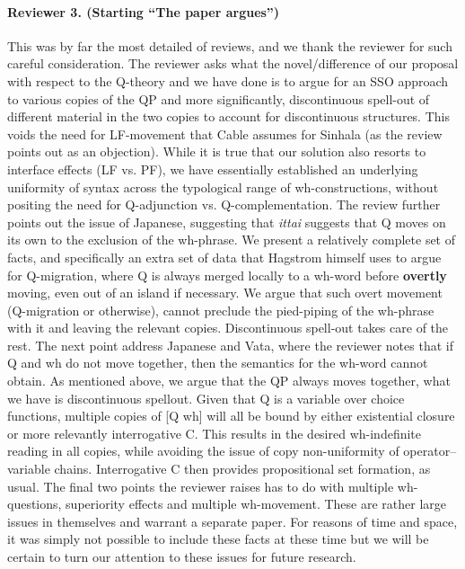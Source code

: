 \documentclass[11pt]{article}
\begin{document}
\paragraph{Reviewer 3.  (Starting ``The paper argues'')} This was by far the most detailed of reviews, and we thank the reviewer for such careful consideration. The reviewer asks what the novel/difference of our proposal with respect to the Q-theory and we have done is to argue for an SSO approach to various copies of the QP and more significantly, discontinuous spell-out of different material in the two copies to account for discontinuous structures. This voids the need for LF-movement that Cable assumes for Sinhala (as the review points out as an objection). While it is true that our solution also resorts to interface effects (LF vs. PF), we have essentially established an underlying uniformity of syntax across the typological range of wh-constructions, without positing the need for Q-adjunction vs. Q-complementation. The review further points out the issue of Japanese, suggesting that \textit{ittai} suggests that Q moves on its own to the exclusion of the wh-phrase. We present a relatively complete set of facts, and specifically an extra set of data that Hagstrom himself uses to argue for Q-migration, where Q is always merged locally to a wh-word before \textbf{overtly} moving, even out of an island if necessary. We argue that such overt movement (Q-migration or otherwise), cannot preclude the pied-piping of the wh-phrase with it and leaving the relevant copies. Discontinuous spell-out takes care of the rest. The next point address Japanese and Vata, where the reviewer notes that if Q and wh do not move together, then the semantics for the wh-word cannot obtain. As mentioned above, we argue that the QP always moves together, what we have is discontinuous spellout. Given that Q is a variable over choice functions, multiple copies of [Q wh] will all be bound by either existential closure or more relevantly interrogative C. This results in the desired wh-indefinite reading in all copies, while avoiding the issue of copy non-uniformity of operator--variable chains. Interrogative C then provides propositional set formation, as usual. The final two points the reviewer raises has to do with multiple wh-questions, superiority effects and multiple wh-movement. These are rather large issues in themselves and warrant a separate paper. For reasons of time and space, it was simply not possible to include these facts at these time but we will be certain to turn our attention to these issues for future research.
\end{document}

